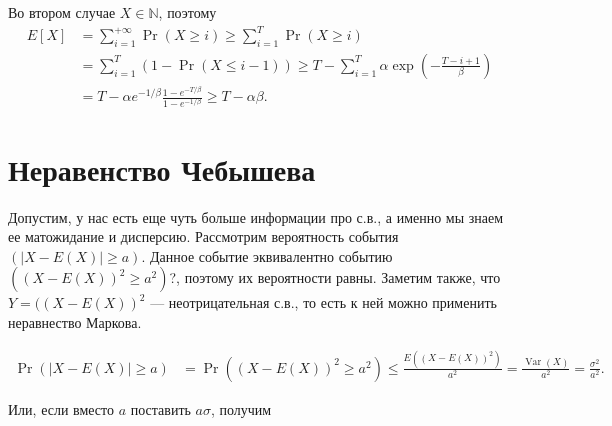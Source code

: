 \documentclass[12pt]{article}
\newcommand\N{\mathbb{N}}
\DeclareMathOperator{\Var}{Var}
\begin{document}
Во втором случае $X \in \N$, поэтому
\begin{align*}
  E[X] &= \sum_{i = 1}^{+\infty} \Pr(X \ge i) \ge \sum_{i = 1}^{T} \Pr(X \ge i) \\
       &= \sum_{i = 1}^T (1 - \Pr(X \le i - 1)) \ge T - \sum_{i = 1}^{T} \alpha\exp\left(-\frac{T - i + 1}{\beta}\right) \\
       &= T - \alpha e^{-1/\beta} \frac{1 - e^{-T/\beta}}{1 - e^{-1/\beta}} \ge T - \alpha\beta. 
\end{align*}

\section{Неравенство Чебышева}

Допустим, у нас есть еще чуть больше информации про с.в., а именно мы знаем ее матожидание и дисперсию. Рассмотрим вероятность события $(|X - E(X)| \ge a)$. Данное событие эквивалентно событию $((X - E(X))^2 \ge a^2)$?, поэтому их вероятности равны. Заметим также, что $Y = ((X - E(X))^2$ --- неотрицательная с.в., то есть к ней можно применить неравнество Маркова.

\begin{align*}
  \Pr(|X - E(X)| \ge a) &= \Pr((X - E(X))^2 \ge a^2) \le \frac{E((X - E(X))^2)}{a^2} = \frac{\Var(X)}{a^2} = \frac{\sigma^2}{a^2}.
\end{align*}

\begin{center}
\end{center}

Или, если вместо $a$ поставить $a\sigma$, получим


\begin{center}
\end{center}
\end{document}
